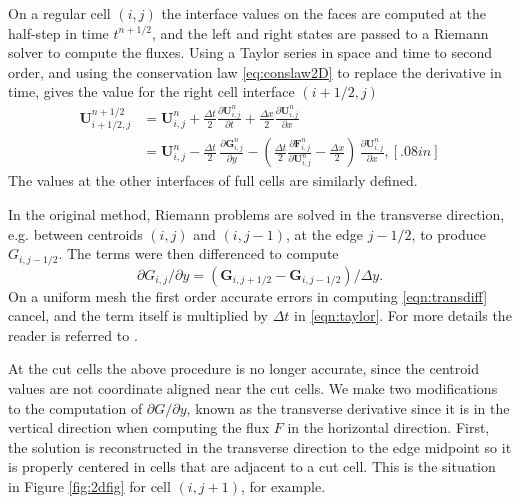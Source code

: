 On a regular cell $(i,j)$ the interface values on the 
faces are computed at the half-step in time $t^{n+1/2}$, and the left and right states
are passed to a Riemann
solver to compute the fluxes.
Using a Taylor series in space and time to second order,
and using the conservation law \eqref{eq:conslaw2D}  to replace the derivative in time, gives the value for the right cell
interface $(i+1/2,j)$ 
\begin{subequations}
\begin{align}
\label{eqn:taylor}
\mathbf{U}_{i+1/2,j}^{n+1/2}    
              &= \mathbf{U}_{i,j}^n +  
\frac{\Delta t}{2} \frac{\partial \mathbf{U}_{i,j}^n}{\partial t} + 
\frac{\Delta x}{2} \frac{\partial \mathbf{U}_{i,j}^n}{\partial x} \\[.08in]
              &= \mathbf{U}_{i,j}^n - \frac{\Delta t}{2} \, 
             \frac{\partial \mathbf{G}_{i,j}^n}{\partial y}  -
            \left( \frac{\Delta t}{2} 
            \frac{\partial \mathbf{F}_{i,j}^n}{\partial \mathbf{U}^n_{i,j}} -
             \frac{\Delta x}{2} \right) \,\frac{\partial \mathbf{U}_{i,j}^n}{\partial x}, [.08in]
\end{align}
\end{subequations}
The values at the other interfaces of full cells are similarly defined.


In the original method,
Riemann problems are solved in the transverse direction, e.g. between
centroids $(i,j)$ and $(i,j-1)$, at the edge $j-1/2$, to produce
$G_{i,j-1/2}$. 
The terms were then differenced to compute 
\begin{equation}
\partial G_{i,j}/\partial y =  (\mathbf{G}_{i,j+1/2} - \mathbf{G}_{i,j-1/2})/\Delta y .
\label{eqn:transdiff}
\end{equation}
On a uniform mesh 
the first order accurate errors in computing \eqref{eqn:transdiff} 
cancel, and the term itself is 
multiplied by $\Delta t$ in \eqref{eqn:taylor}.
For more details the reader is referred to \cite{Colella:Unsplit}.

At the cut cells the above procedure is no longer accurate,
since  the centroid values are not coordinate aligned near
the cut cells.
We make two modifications to the
computation of $\partial G/\partial y$, known as the
transverse derivative since it is in the vertical direction
when computing the flux $F$ in the horizontal direction.
First,
the solution is reconstructed in the transverse direction
to the edge midpoint so it is properly centered in cells that
are adjacent to a cut cell.  This is the situation
in Figure \ref{fig:2dfig} for cell $(i,j+1)$, for example.


